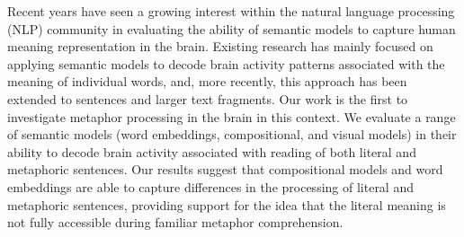 Recent years have seen a growing interest within the natural language processing (NLP) community in evaluating the ability of semantic models to capture human meaning representation in the brain. Existing research has mainly focused on applying semantic models to decode brain activity patterns associated with the meaning of individual words, and, more recently, this approach has been extended to sentences and larger text fragments. Our work is the first to investigate metaphor processing in the brain in this context. We evaluate a range of semantic models (word embeddings, compositional, and visual models) in their ability to decode brain activity associated with reading of both literal and metaphoric sentences. Our results suggest that compositional models and word embeddings are able to capture differences in the processing of literal and metaphoric sentences, providing support for the idea that the literal meaning is not fully accessible during familiar metaphor comprehension.